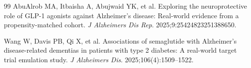 \documentclass[11pt, a4paper]{article}
\begin{document}
\begin{thebibliography}{99}
 AbuAlrob MA, Itbaisha A, Abujwaid YK, et al.
Exploring the neuroprotective role of GLP-1 agonists against Alzheimer's
disease: Real-world evidence from a propensity-matched cohort. \textit{J
Alzheimers Dis Rep}. 2025;9:25424823251388650.

 Wang W, Davis PB, Qi X, et al. Associations of
semaglutide with Alzheimer's disease-related dementias in patients with
type 2 diabetes: A real-world target trial emulation study. \textit{J
Alzheimers Dis}. 2025;106(4):1509--1522.

\end{thebibliography}
\end{document}
